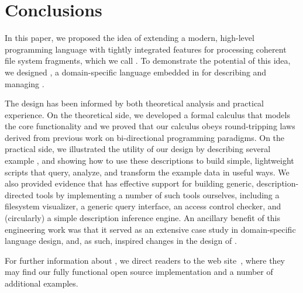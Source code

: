\section{Conclusions}
\label{sec:conclusion}


In this paper, we proposed the idea of extending a modern, high-level
programming language with tightly integrated features for
processing coherent file system fragments, which we call
\filestores{}.  To demonstrate the
potential of this idea, we designed \forest{}, a
domain-specific language 
embedded in \haskell{}
for describing and managing \filestores{}.  

The \forest{} design has been informed by both
theoretical analysis and practical experience.
On the theoretical side, 
we developed a formal
calculus that models the core \forest{} functionality and
we proved that our calculus obeys round-tripping laws
derived from previous work on bi-directional programming paradigms.
On the practical side, 
we illustrated the utility of our design
by describing several example \filestores{}, and showing how
to use these descriptions
to build simple, lightweight \haskell{} scripts that query,  
analyze, and transform the example data in useful ways.
We also provided evidence that
\forest{} has effective support for building
generic, description-directed tools by 
implementing a number of such 
tools ourselves, including a filesystem visualizer,
a generic query interface, an access control checker, and
(circularly) a simple description inference engine.
An ancillary benefit of this 
engineering work was that it
served as an extensive case study in domain-specific
language design, and, as such, inspired changes in the design of
\template{}.  

For further information about \forest{}, we direct readers to
the \forest{} web site~\cite{forest-web-site}, where they may find
our fully functional open source implementation and a number of
additional examples.

